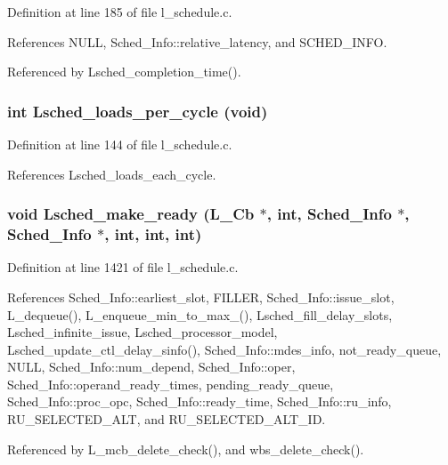 Definition at line 185 of file l\_\-schedule.c.

References NULL, Sched\_\-Info::relative\_\-latency, and SCHED\_\-INFO.

Referenced by Lsched\_\-completion\_\-time().
\subsubsection{\setlength{\rightskip}{0pt plus 5cm}int Lsched\_\-loads\_\-per\_\-cycle (void)}\label{l__schedule_8h_8dc9c8930405b68ae031fc5d17082581}




Definition at line 144 of file l\_\-schedule.c.

References Lsched\_\-loads\_\-each\_\-cycle.
\subsubsection{\setlength{\rightskip}{0pt plus 5cm}void Lsched\_\-make\_\-ready (L\_\-Cb $\ast$, int, \bf{Sched\_\-Info} $\ast$, \bf{Sched\_\-Info} $\ast$, int, int, int)}\label{l__schedule_8h_38a7ad11bd117f1e19d2e5256eb19a61}




Definition at line 1421 of file l\_\-schedule.c.

References Sched\_\-Info::earliest\_\-slot, FILLER, Sched\_\-Info::issue\_\-slot, L\_\-dequeue(), L\_\-enqueue\_\-min\_\-to\_\-max\_(), Lsched\_\-fill\_\-delay\_\-slots, Lsched\_\-infinite\_\-issue, Lsched\_\-processor\_\-model, Lsched\_\-update\_\-ctl\_\-delay\_\-sinfo(), Sched\_\-Info::mdes\_\-info, not\_\-ready\_\-queue, NULL, Sched\_\-Info::num\_\-depend, Sched\_\-Info::oper, Sched\_\-Info::operand\_\-ready\_\-times, pending\_\-ready\_\-queue, Sched\_\-Info::proc\_\-opc, Sched\_\-Info::ready\_\-time, Sched\_\-Info::ru\_\-info, RU\_\-SELECTED\_\-ALT, and RU\_\-SELECTED\_\-ALT\_\-ID.

Referenced by L\_\-mcb\_\-delete\_\-check(), and wbs\_\-delete\_\-check().
